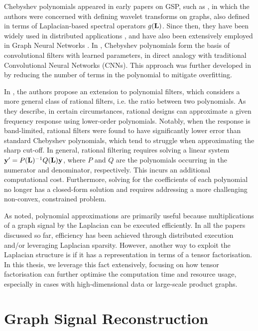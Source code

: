 Chebyshev polynomials appeared in early papers on GSP, such as \citep{Hammond2011}, in which the authors were concerned with defining wavelet transforms on graphs, also defined in terms of Laplacian-based spectral operators $g(\mathbf{L})$. Since then, they have been widely used in distributed applications \citep{Shuman2018}, and have also been extensively employed in Graph Neural Networks \citep{Gama2020}. In \cite{Defferrard2017}, Chebyshev polynomials form the basis of convolutional filters with learned parameters, in direct analogy with traditional Convolutional Neural Networks (CNNs). This approach was further developed in \cite{Kipf2017} by reducing the number of terms in the polynomial to mitigate overfitting.

In \cite{Rimleanscaia2020, Tseng2020}, the authors propose an extension to polynomial filters, which considers a more general class of rational filters, i.e. the ratio between two polynomials. As they describe, in certain circumstances, rational designs can approximate a given frequency response using lower-order polynomials. Notably, when the response is band-limited, rational filters were found to have significantly lower error than standard Chebyshev polynomials, which tend to struggle when approximating the sharp cut-off. In general, rational filtering requires solving a linear system $\mathbf{y}' = P(\mathbf{L})^{-1} Q(\mathbf{L}) \mathbf{y}$, where $P$ and $Q$ are the polynomials occurring in the numerator and denominator, respectively. This incurs an additional computational cost. Furthermore, solving for the coefficients of each polynomial no longer has a closed-form solution and requires addressing a more challenging non-convex, constrained problem.

As noted, polynomial approximations are primarily useful because multiplications of a graph signal by the Laplacian can be executed efficiently. In all the papers discussed so far, efficiency has been achieved through distributed execution and/or leveraging Laplacian sparsity. However, another way to exploit the Laplacian structure is if it has a representation in terms of a tensor factorisation. In this thesis, we leverage this fact extensively, focusing on how tensor factorisation can further optimise the computation time and resource usage, especially in cases with high-dimensional data or large-scale product graphs.


\section{Graph Signal Reconstruction}

